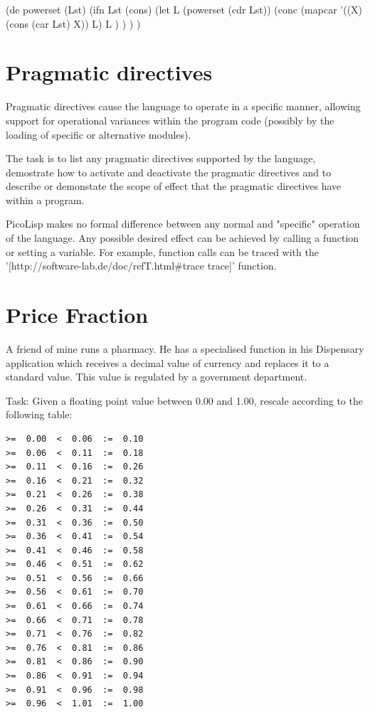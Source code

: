 \begin{wideverbatim}

(de powerset (Lst)
   (ifn Lst
      (cons)
      (let L (powerset (cdr Lst))
         (conc
            (mapcar '((X) (cons (car Lst) X)) L)
            L ) ) ) )

\end{wideverbatim}

\pagebreak{}
\section*{Pragmatic directives}

Pragmatic directives cause the language to operate in a specific manner,
allowing support for operational variances within the program code
(possibly by the loading of specific or alternative modules).

The task is to list any pragmatic directives supported by the language,
demostrate how to activate and deactivate the pragmatic directives and
to describe or demonstate the scope of effect that the pragmatic
directives have within a program.

\begin{wideverbatim}

PicoLisp makes no formal difference between any normal and "specific" operation
of the language. Any possible desired effect can be achieved by calling a
function or setting a variable. For example, function calls can be traced with
the '[http://software-lab.de/doc/refT.html#trace trace]' function.

\end{wideverbatim}

\pagebreak{}
\section*{Price Fraction}

A friend of mine runs a pharmacy. He has a specialised function in his
Dispensary application which receives a decimal value of currency and
replaces it to a standard value. This value is regulated by a government
department.

Task: Given a floating point value between 0.00 and 1.00, rescale
according to the following table:

\begin{verbatim}
>=  0.00  <  0.06  :=  0.10
>=  0.06  <  0.11  :=  0.18
>=  0.11  <  0.16  :=  0.26
>=  0.16  <  0.21  :=  0.32
>=  0.21  <  0.26  :=  0.38
>=  0.26  <  0.31  :=  0.44
>=  0.31  <  0.36  :=  0.50
>=  0.36  <  0.41  :=  0.54
>=  0.41  <  0.46  :=  0.58
>=  0.46  <  0.51  :=  0.62
>=  0.51  <  0.56  :=  0.66
>=  0.56  <  0.61  :=  0.70
>=  0.61  <  0.66  :=  0.74
>=  0.66  <  0.71  :=  0.78
>=  0.71  <  0.76  :=  0.82
>=  0.76  <  0.81  :=  0.86
>=  0.81  <  0.86  :=  0.90
>=  0.86  <  0.91  :=  0.94
>=  0.91  <  0.96  :=  0.98
>=  0.96  <  1.01  :=  1.00
\end{verbatim}

